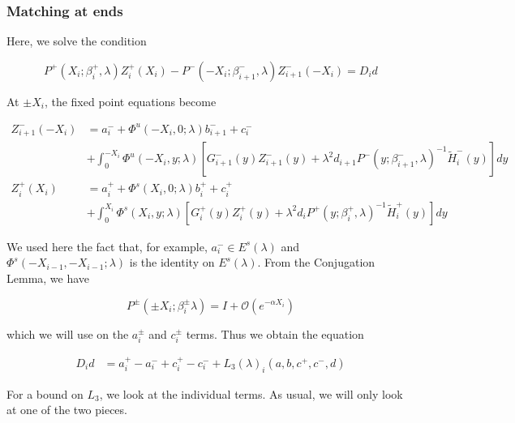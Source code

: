 \documentclass[12pt]{article}
\begin{document}

\subsubsection*{Matching at ends}

Here, we solve the condition

\[
P^+(X_i; \beta_i^+, \lambda) Z_i^+(X_i) - P^-(-X_i; \beta_{i+1}^-, \lambda) Z_{i+1}^-(-X_i) = D_i d
\]

At $\pm X_i$, the fixed point equations become

\begin{align*}
Z_{i+1}^-(-X_i) &= a_i^- + \Phi^u(-X_i, 0; \lambda) b_{i+1}^- + c_i^- \\
&+ \int_0^{-X_i} \Phi^u(-X_i, y; \lambda)[ G_{i+1}^-(y) Z_{i+1}^-(y) + \lambda^2 d_{i+1} P^-(y; \beta_{i+1}^-, \lambda)^{-1} \tilde{H}_i^-(y) ] dy \\
Z_i^+(X_i) &= a_i^+ + \Phi^s(X_i, 0; \lambda) b_i^+ + c_i^+ \\
&+ \int_0^{X_i} \Phi^s(X_i, y; \lambda)[ G_i^+(y) Z_i^+(y) + \lambda^2 d_i P^+(y; \beta_i^+, \lambda)^{-1} \tilde{H}_i^+(y) ] dy
\end{align*}

We used here the fact that, for example, $a_i^- \in E^s(\lambda)$ and $\Phi^s(-X_{i-1}, -X_{i-1}; \lambda)$ is the identity on $E^s(\lambda)$. From the Conjugation Lemma, we have

\begin{equation}\label{conjest}
P^\pm(\pm X_i; \beta_i^\pm \lambda) = I + \mathcal{O}(e^{-\alpha X_i})
\end{equation}

which we will use on the $a_i^\pm$ and $c_i^\pm$ terms. Thus we obtain the equation

\begin{align}\label{Dideq1}
D_i d &= a_i^+ - a_i^- + c_i^+ - c_i^- + L_3(\lambda)_i(a, b, c^+, c^-, d)
\end{align}

For a bound on $L_3$, we look at the individual terms. As usual, we will only look at one of the two pieces.
\end{document}
